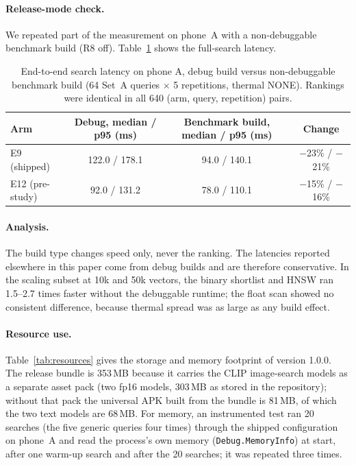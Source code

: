 \documentclass[pdflatex,sn-basic,Numbered]{sn-jnl}
\begin{document}
\paragraph{Release-mode check.} We repeated part of the measurement on phone~A with a non-debuggable benchmark build (R8 off). Table~\ref{tab:release} shows the full-search latency.

\begin{table}[tbp]
\centering\footnotesize\setlength{\tabcolsep}{3pt}
\caption{End-to-end search latency on phone A, debug build versus non-debuggable benchmark build (64 Set~A queries $\times$ 5 repetitions, thermal NONE). Rankings were identical in all 640 (arm, query, repetition) pairs.}
\label{tab:release}
\begin{tabular}{lccc}
\toprule
Arm & Debug, median / p95 (ms) & Benchmark build, median / p95 (ms) & Change \\
\midrule
E9 (shipped) & 122.0 / 178.1 & 94.0 / 140.1 & $-$23\% / $-$21\% \\
E12 (pre-study) & 92.0 / 131.2 & 78.0 / 110.1 & $-$15\% / $-$16\% \\
\bottomrule
\end{tabular}
\end{table}

\paragraph{Analysis.} The build type changes speed only, never the ranking. The latencies reported elsewhere in this paper come from debug builds and are therefore conservative. In the scaling subset at 10k and 50k vectors, the binary shortlist and HNSW ran 1.5--2.7 times faster without the debuggable runtime; the float scan showed no consistent difference, because thermal spread was as large as any build effect.

\paragraph{Resource use.} Table~\ref{tab:resources} gives the storage and memory footprint of version 1.0.0. The release bundle is 353\,MB because it carries the CLIP image-search models as a separate asset pack (two fp16 models, 303\,MB as stored in the repository); without that pack the universal APK built from the bundle is 81\,MB, of which the two text models are 68\,MB. For memory, an instrumented test ran 20 searches (the five generic queries four times) through the shipped configuration on phone~A and read the process's own memory (\texttt{Debug.MemoryInfo}) at start, after one warm-up search and after the 20 searches; it was repeated three times.
\end{document}
